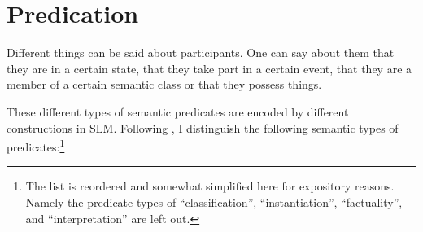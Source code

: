 

%

\section{Predication}\label{sec:func:Predication}
Different things  can be said about participants. One can say about them that they are in a certain state, that they take part  in a certain event, that they are a member of a certain semantic class or that they possess things.

These different types of semantic predicates are encoded by different constructions in SLM. Following \citet[106]{Hengeveld1992nvpttd}, I distinguish the following semantic types of predicates:\footnote{The list is reordered and somewhat simplified here for expository reasons. Namely the predicate types of ``classification'', ``instantiation'', ``factuality'', and ``interpretation'' are left out.}

